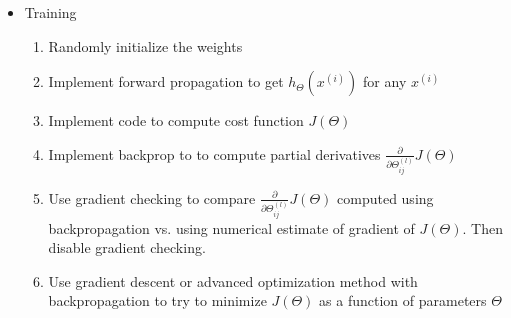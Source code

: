 \begin{itemize}
\item
    Training
    \begin{enumerate}
        \item
        Randomly initialize the weights
        \item
        Implement forward propagation to get $h_{\Theta}(x^{(i)})$ for any $x^{(i)}$
        \item
        Implement code to compute cost function $J(\Theta)$
        \item
        Implement backprop to to compute partial derivatives $\frac{\partial}{\partial{\Theta_{ij}^{(l)}}} J(\Theta)$
        \item
        Use gradient checking to compare $\frac{\partial}{\partial{\Theta_{ij}^{(l)}}} J(\Theta)$ computed using backpropagation vs. using numerical estimate of gradient of $J(\Theta)$. Then disable gradient checking.
        \item
        Use gradient descent or advanced optimization method with backpropagation to try to minimize $J(\Theta)$ as a function of parameters $\Theta$
        

\end{enumerate}
\end{itemize}

